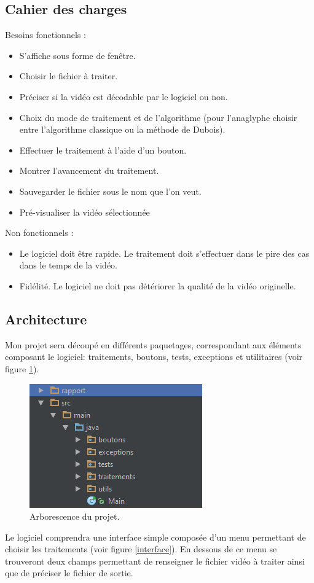 \documentclass[10pt,a4paper]{article}
\begin{document}
\subsection{Cahier des charges}

Besoins fonctionnels :\newline
\begin{itemize}
\item S'affiche sous forme de fenêtre.
\item Choisir le fichier à traiter.
\item Préciser si la vidéo est décodable par le logiciel ou non.
\item Choix du mode de traitement et de l'algorithme (pour l'anaglyphe choisir entre l'algorithme classique ou la méthode
de Dubois).
\item Effectuer le traitement à l'aide d'un bouton.
\item Montrer l'avancement du traitement.
\item Sauvegarder le fichier sous le nom que l'on veut.
\item Pré-visualiser la vidéo sélectionnée\newline
\end{itemize}

Non fonctionnels :\newline
\begin{itemize}
\item Le logiciel doit être rapide. Le traitement doit s'effectuer dans le pire des cas dans le temps de la vidéo.
\item Fidélité. Le logiciel ne doit pas détériorer la qualité de la vidéo originelle.
\newline
\end{itemize}

\subsection{Architecture}

Mon projet sera découpé en différents paquetages, correspondant aux éléments composant le logiciel: traitements, boutons, tests, exceptions et utilitaires (voir figure \ref{arbo}).

\begin{figure}[!h]
\center
\includegraphics[scale = 1]{tree.PNG}
\caption{Arborescence du projet.}
\label{arbo}
\end{figure}
Le logiciel comprendra une interface simple composée d'un menu permettant de choisir les traitements (voir figure \ref{interface}). En dessous de ce menu se trouveront deux champs permettant de renseigner le fichier vidéo à traiter ainsi que de préciser le fichier de sortie.
\end{document}
